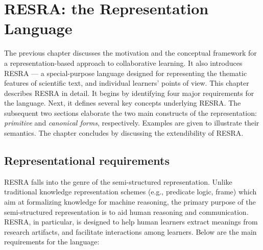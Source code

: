 
\setcounter{chapter}{2}
\chapter{RESRA: the Representation Language}
\label{sec:resra}

The previous chapter discusses the motivation and the conceptual framework
for a representation-based approach to collaborative learning. It also
introduces RESRA --- a special-purpose language designed for representing
the thematic features of scientific text, and individual learners' points
of view. This chapter describes RESRA in detail. It begins by identifying
four major requirements for the language. Next, it defines several key
concepts underlying RESRA. The subsequent two sections elaborate the two
main constructs of the representation: {\it primitive\/} and {\it canonical
forms}, respectively. Examples are given to illustrate their semantics. The
chapter concludes by discussing the extendibility of RESRA.

\section{Representational requirements}
\label{sec:c3-design}

RESRA falls into the genre of the semi-structured representation.  Unlike
traditional knowledge representation schemes (e.g., predicate logic, frame)
which aim at formalizing knowledge for machine reasoning, the primary
purpose of the semi-structured representation is to aid human reasoning and
communication. RESRA, in particular, is designed to help human learners
extract meanings from research artifacts, and facilitate interactions among
learners. Below are the main requirements for the language:

